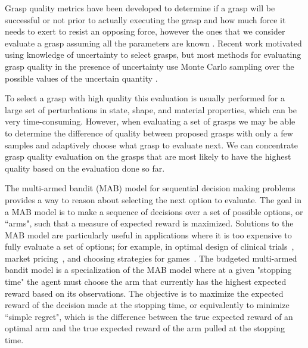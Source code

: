 \documentclass[journal,transmag]{IEEEtran}%
\begin{document}
Grasp quality metrics have been developed to determine if a grasp will be successful or not prior to actually executing the grasp and how much force it needs to exert to resist an opposing force, however the ones that we consider evaluate a grasp assuming all the parameters are known \cite{ferrari1992}.
Recent work \cite{kehoe2012estimating,mahler2015gp} motivated using knowledge of uncertainty to select grasps, but most methods for evaluating grasp quality in the presence of uncertainty use Monte Carlo sampling over the possible values of the uncertain quantity \cite{kim2012physically, weisz2012pose}.

To select a grasp with high quality this evaluation is usually performed for a large set of perturbations in state, shape, and material properties, which can be very time-consuming.
However, when evaluating a set of grasps we may be able to determine the difference of quality between proposed grasps with only a few samples and adaptively choose what grasp to evaluate next. We can concentrate grasp quality evaluation on the grasps that are most likely to have the highest quality based on the evaluation done so far.


The multi-armed bandit (MAB) model for sequential decision making problems \cite{barto1998reinforcement, lai1985asymptotically, robbins1952some} provides a way to reason about selecting the next option to evaluate.
The goal in a MAB model is to make a sequence of decisions over a set of possible options, or ``arms", such that a measure of expected reward is maximized.
Solutions to the MAB model are particularly useful in applications where it is too expensive to fully evaluate a set of options; for example, in optimal design of clinical trials~\cite{simon1989optimal}, market pricing~\cite{rothschild1974two}, and choosing strategies for games~\cite{st2012online}.
The budgeted multi-armed bandit model \cite{madani2004budgeted} is a specialization of the MAB model where at a given "stopping time" the agent must choose the arm that currently has the highest expected reward based on its observations. 
The objective is to maximize the expected reward of the decision made at the stopping time, or equivalently to minimize ``simple regret", which is the difference between the true expected reward of an optimal arm and the true expected reward of the arm pulled at the stopping time.
\end{document}
